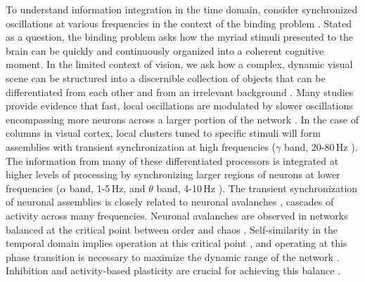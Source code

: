 \documentclass[aip,amsmath,amssymb,reprint,nofootinbib]{revtex4-1}
\begin{document}
To understand information integration in the time domain, consider synchronized oscillations at various frequencies in the context of the binding problem \cite{ro1999,tr1999}. Stated as a question, the binding problem asks how the myriad stimuli presented to the brain can be quickly and continuously organized into a coherent cognitive moment. In the limited context of vision, we ask how a complex, dynamic visual scene can be structured into a discernible collection of objects that can be differentiated from each other and from an irrelevant background \cite{rede1999}. Many studies provide evidence that fast, local oscillations are modulated by slower oscillations encompassing more neurons across a larger portion of the network \cite{vala2001,sase2001,enfr2001,lued1997,stsa2000,budr2004,bu2006,fr2015}. In the case of columns in visual cortex, local clusters tuned to specific stimuli will form assemblies with transient synchronization at high frequencies ($\gamma$ band, 20-80\,Hz \cite{budr2004}). The information from many of these differentiated processors is integrated at higher levels of processing by synchronizing larger regions of neurons at lower frequencies ($\alpha$ band, 1-5\,Hz, and $\theta$ band, 4-10\,Hz \cite{stsa2000,budr2004}). The transient synchronization of neuronal assemblies is closely related to neuronal avalanches \cite{be2007,shya2009}, cascades of activity across many frequencies. Neuronal avalanches are observed in networks balanced at the critical point between order and chaos \cite{be2007,kism2009,shya2009,ch2010,rusp2011}. Self-similarity in the temporal domain implies operation at this critical point \cite{be2007,kism2009,rusp2011}, and operating at this phase transition is necessary to maximize the dynamic range of the network \cite{shya2009}. Inhibition and activity-based plasticity are crucial for achieving this balance \cite{budr2004,bu2006,siqu2007}.  
\end{document}
